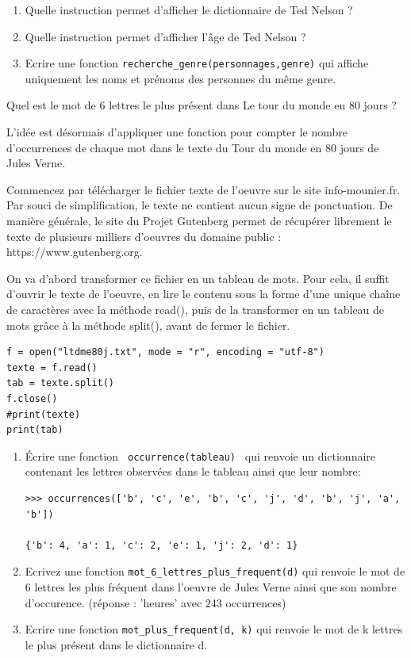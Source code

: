 \documentclass[a4paper,12pt,openany]{book}
\begin{document}
\begin{enumerate}
	\item Quelle instruction permet d'afficher le dictionnaire de Ted Nelson ? \dotfill
	
	\item Quelle instruction permet d'afficher l'âge de Ted Nelson ? \dotfill
	
	\item Ecrire une fonction \verb+recherche_genre(personnages,genre)+ qui affiche uniquement les noms et prénoms des personnes du même genre.
	
\end{enumerate}

\bigskip

\exo  Quel est le mot de 6 lettres le plus présent dans Le tour du monde en 80 jours ?


L'idée est désormais d'appliquer une fonction pour compter le nombre d'occurrences de chaque mot dans le texte du Tour du monde en 80 jours de Jules Verne.

Commencez par télécharger le fichier texte de l'oeuvre sur le site info-mounier.fr. Par souci de simplification, le texte ne contient aucun signe de ponctuation. De manière générale, le site du Projet Gutenberg permet de récupérer librement le texte de plusieurs milliers d'oeuvres du domaine public : https://www.gutenberg.org.

On va d'abord transformer ce fichier en un tableau de mots. Pour cela, il suffit d'ouvrir le texte de l'oeuvre, en lire le contenu sous la forme d'une unique chaîne de caractères avec la méthode read(), puis de la transformer en un tableau de mots grâce à la méthode split(), avant de fermer le fichier.

\begin{lstlisting}[numbers = none]
f = open("ltdme80j.txt", mode = "r", encoding = "utf-8")
texte = f.read()
tab = texte.split()
f.close()
#print(texte)
print(tab)
\end{lstlisting}

\begin{enumerate}
	\item Écrire une fonction \verb+ occurrence(tableau) + qui renvoie un dictionnaire contenant les lettres observées dans le tableau ainsi que leur nombre:
	
\begin{lstlisting}[numbers = none]
>>> occurrences(['b', 'c', 'e', 'b', 'c', 'j', 'd', 'b', 'j', 'a', 'b'])

{'b': 4, 'a': 1, 'c': 2, 'e': 1, 'j': 2, 'd': 1}	
\end{lstlisting}

\item Ecrivez une fonction \verb+mot_6_lettres_plus_frequent(d)+ qui renvoie le mot de 6 lettres les plus fréquent dans l'oeuvre de Jules Verne ainsi que son nombre d'occurence. (réponse : 'heures' avec 243 occurrences)

\item Ecrire une fonction \verb+mot_plus_frequent(d, k)+ qui renvoie le mot de k lettres le plus présent dans le dictionnaire d.
\end{enumerate}
\end{document}
